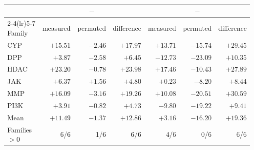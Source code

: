 \begin{tabular}{lrrrrrr}
\toprule
 & \multicolumn{3}{c}{\mt{} $-$ \stl{}} & \multicolumn{3}{c}{\pooled{} $-$ \stl{}} \\
\cmidrule(lr){2-4}\cmidrule(lr){5-7}
Family & measured & permuted & difference & measured & permuted & difference \\
\midrule
CYP & $+15.51$ & $-2.46$ & $+17.97$ & $+13.71$ & $-15.74$ & $+29.45$ \\
DPP & $+3.87$ & $-2.58$ & $+6.45$ & $-12.73$ & $-23.09$ & $+10.35$ \\
HDAC & $+23.20$ & $-0.78$ & $+23.98$ & $+17.46$ & $-10.43$ & $+27.89$ \\
JAK & $+6.37$ & $+1.56$ & $+4.80$ & $+0.23$ & $-8.20$ & $+8.44$ \\
MMP & $+16.09$ & $-3.16$ & $+19.26$ & $+10.08$ & $-20.51$ & $+30.59$ \\
PI3K & $+3.91$ & $-0.82$ & $+4.73$ & $-9.80$ & $-19.22$ & $+9.41$ \\
\midrule
Mean & $+11.49$ & $-1.37$ & $+12.86$ & $+3.16$ & $-16.20$ & $+19.36$ \\
Families $>0$ & 6/6 & 1/6 & 6/6 & 4/6 & 0/6 & 6/6 \\
\bottomrule
\end{tabular}
